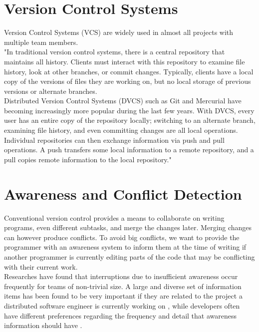 \section{Version Control Systems}


Version Control Systems (VCS) are widely used in almost all projects with multiple team members. \\

"In traditional version control systems, there is a central repository that maintains all history. Clients must interact with this repository to examine file history, look at other branches, or commit changes. Typically, clients have a local copy of the versions of files they are working on, but no local storage of previous versions or alternate branches. \\

Distributed Version Control Systems (DVCS) such as Git and Mercurial have becoming increasingly more popular during the last few years. With DVCS, every user has an entire copy of the repository locally; switching to an alternate branch, examining file history, and even committing changes are all local operations. Individual repositories can then exchange information via push and pull operations. A push transfers some local information to a remote repository, and a pull copies remote information to the local repository." \cite{ref17}




\section{Awareness and Conflict Detection}





Conventional version control provides a means to collaborate on writing programs, even different subtasks, and merge the changes later. Merging changes can however produce conflicts. To avoid big conflicts, we want to provide the programmer with an awareness system to inform them at the time of writing if another programmer is currently editing parts of the code that may be conflicting with their current work. \\

Researches have found that interruptions due to insufficient awareness occur frequently for teams of non-trivial size. A large and diverse set of information items has been found to be very important if they are related to the project a distributed software engineer is currently working on \cite{ref21}, while developers often have different preferences regarding the frequency and detail that awareness information should have \cite{ref3}. 




